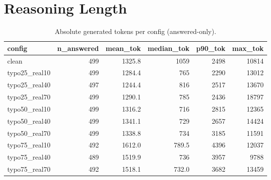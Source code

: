 \documentclass[11pt]{article}
\begin{document}
\section*{Reasoning Length}
\begin{table}[H]
\centering
\caption{Absolute generated tokens per config (answered-only).}
\small
\begin{adjustbox}{max width=\textwidth}
\begin{tabular}{lrrrrr}
\toprule
\textbf{config} & \textbf{n\_answered} & \textbf{mean\_tok} & \textbf{median\_tok} & \textbf{p90\_tok} & \textbf{max\_tok} \\
\midrule
clean & 499 & 1325.8 & 1059 & 2498 & 10814 \\
typo25\_real10 & 499 & 1284.4 & 765 & 2290 & 13012 \\
typo25\_real40 & 497 & 1244.4 & 816 & 2517 & 13670 \\
typo25\_real70 & 499 & 1290.1 & 785 & 2436 & 18797 \\
typo50\_real10 & 499 & 1316.2 & 716 & 2815 & 12365 \\
typo50\_real40 & 499 & 1341.1 & 729 & 2657 & 14424 \\
typo50\_real70 & 499 & 1338.8 & 734 & 3185 & 11591 \\
typo75\_real10 & 492 & 1612.0 & 789.5 & 4396 & 12037 \\
typo75\_real40 & 489 & 1519.9 & 736 & 3957 & 9788 \\
typo75\_real70 & 492 & 1518.1 & 732.0 & 3682 & 13459 \\
\bottomrule
\end{tabular}
\end{adjustbox}
\end{table}
\end{document}
